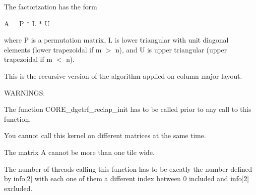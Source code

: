 The factorization has the form

A = P $\ast$ L $\ast$ U

where P is a permutation matrix, L is lower triangular with unit diagonal elements (lower trapezoidal if m $>$ n), and U is upper triangular (upper trapezoidal if m $<$ n).

This is the recursive version of the algorithm applied on column major layout.

W\+A\+R\+N\+I\+N\+G\+S\+:
\begin{DoxyItemize}
\item The function C\+O\+R\+E\+\_\+dgetrf\+\_\+reclap\+\_\+init has to be called prior to any call to this function.
\item You cannot call this kernel on different matrices at the same time.
\item The matrix A cannot be more than one tile wide.
\item The number of threads calling this function has to be excatly the number defined by info\mbox{[}2\mbox{]} with each one of them a different index between 0 included and info\mbox{[}2\mbox{]} excluded.
\end{DoxyItemize}


